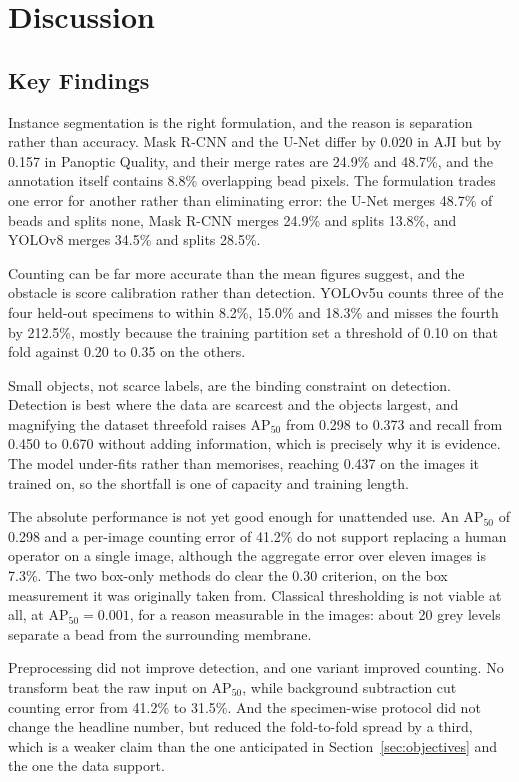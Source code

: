 \section{Discussion}

\subsection{Key Findings}

Instance segmentation is the right formulation, and the reason is
separation rather than accuracy. Mask R-CNN and the U-Net differ by 0.020 in AJI
but by 0.157 in Panoptic Quality, and their merge rates are 24.9\% and 48.7\%, and
the annotation itself contains 8.8\% overlapping bead pixels. The formulation
trades one error for another rather than eliminating error: the U-Net merges
48.7\% of beads and splits none, Mask R-CNN merges 24.9\% and splits 13.8\%, and
YOLOv8 merges 34.5\% and splits 28.5\%.

Counting can be far more accurate than the mean figures suggest, and the
obstacle is score calibration rather than detection. YOLOv5u counts three of the
four held-out specimens to within 8.2\%, 15.0\% and 18.3\% and misses the fourth
by 212.5\%, mostly because the training partition set a threshold of 0.10 on that
fold against 0.20 to 0.35 on the others.

Small objects, not scarce labels, are the binding constraint on
detection. Detection is best where the data are scarcest and the objects largest,
and magnifying the dataset threefold raises $\mathrm{AP}_{50}$ from 0.298 to 0.373
and recall from 0.450 to 0.670 without adding information, which is precisely why
it is evidence. The model under-fits rather than memorises, reaching 0.437 on the
images it trained on, so the shortfall is one of capacity and training length.

The absolute performance is not yet good enough for unattended use. An
$\mathrm{AP}_{50}$ of 0.298 and a per-image counting error of 41.2\% do not support
replacing a human operator on a single image, although the aggregate error
over eleven images is 7.3\%. The two box-only methods do clear the 0.30
criterion, on the box measurement it was originally taken from. Classical
thresholding is not viable at all, at
$\mathrm{AP}_{50} = 0.001$, for a reason measurable in the images: about 20
grey levels separate a bead from the surrounding membrane.

Preprocessing did not improve detection, and one variant improved
counting. No transform beat the raw input on $\mathrm{AP}_{50}$, while background
subtraction cut counting error from 41.2\% to 31.5\%. And the specimen-wise
protocol did not change the headline number, but reduced the fold-to-fold spread
by a third, which is a weaker claim than the one anticipated in
Section~\ref{sec:objectives} and the one the data support.

